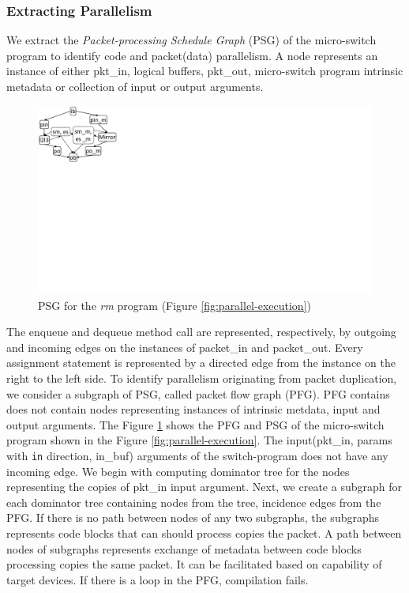 \documentclass{hotnets19}
\begin{document}
\subsubsection{Extracting Parallelism}
We extract the \emph{Packet-processing Schedule Graph} (PSG) of the micro-switch program to identify code and packet(data) parallelism.
A node represents an instance of either pkt\_in, logical buffers, pkt\-\_out, micro-switch program intrinsic metadata or collection of input or output arguments.
\begin{figure}[!h]
    \centering
    \includegraphics[trim=0 370 735 0, clip, scale=0.5]{psg}
    \caption{PSG for the \emph{rm} program (Figure \ref{fig:parallel-execution})}
    \label{fig:graph}
\end{figure}
The enqueue and dequeue method call are represented, respectively, by outgoing and incoming edges on the instances of packet\_in and packet\_out.
Every assignment statement is represented by a directed edge from the instance on the right to the left side.
To identify parallelism originating from packet duplication, we consider a subgraph of PSG, called packet flow graph (PFG).
PFG contains does not contain nodes representing instances of intrinsic metdata, input and output arguments.
The Figure \ref{fig:graph} shows the PFG and PSG of the micro-switch program shown in the Figure \ref{fig:parallel-execution}.
The input(pkt\_in, params with \texttt{in} direction, in\_buf) arguments of the switch-program does not have any incoming edge.
We begin with computing dominator tree for the nodes representing the copies of pkt\_in input argument.
Next, we create a subgraph for each dominator tree containing nodes from the tree, incidence edges from the PFG.
If there is no path between nodes of any two subgraphs, the subgraphs represents code blocks that can should process copies the packet.
A path between nodes of subgraphs represents exchange of metadata between code blocks processing copies the same packet.
It can be facilitated based on capability of target devices.
If there is a loop in the PFG, compilation fails.
\end{document}
